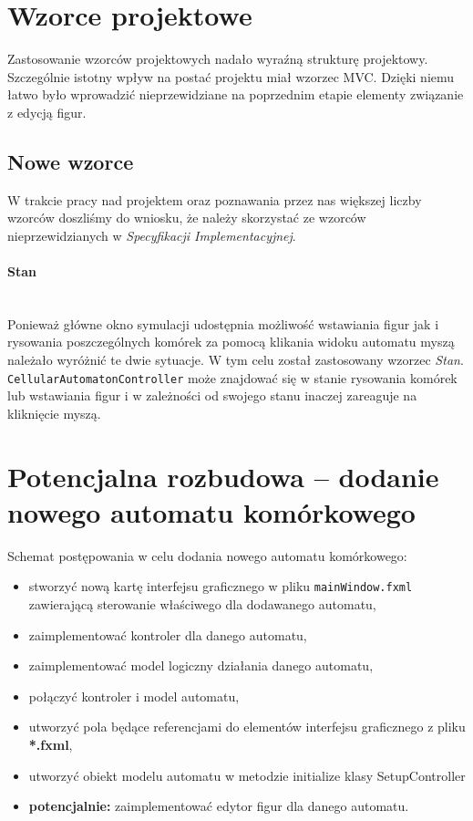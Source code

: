 \documentclass{mwart}
\begin{document}
\section{Wzorce projektowe}
Zastosowanie wzorców projektowych nadało wyraźną strukturę projektowy. Szczególnie istotny wpływ na postać projektu miał wzorzec MVC. Dzięki niemu łatwo było wprowadzić nieprzewidziane na poprzednim etapie elementy związanie z edycją figur.

\subsection{Nowe wzorce}
W trakcie pracy nad projektem oraz poznawania przez nas większej liczby wzorców doszliśmy do wniosku, że należy skorzystać ze wzorców nieprzewidzianych w \textit{Specyfikacji Implementacyjnej}.

\paragraph{Stan} \mbox{} \\
Ponieważ główne okno symulacji udostępnia możliwość wstawiania figur jak i rysowania poszczególnych komórek za pomocą klikania widoku automatu myszą należało wyróżnić te dwie sytuacje. 
W tym celu został zastosowany wzorzec \textit{Stan}. \texttt{CellularAutomatonController} może znajdować się w stanie rysowania komórek lub wstawiania figur i w zależności od swojego stanu inaczej zareaguje na kliknięcie myszą.

\section{Potencjalna rozbudowa -- dodanie nowego automatu komórkowego}
Schemat postępowania w celu dodania nowego automatu komórkowego:
\begin{itemize}
	\item stworzyć nową kartę interfejsu graficznego w pliku \texttt{mainWindow.fxml} zawierającą sterowanie właściwego dla dodawanego automatu,
	\item zaimplementować kontroler dla danego automatu,
	\item zaimplementować model logiczny działania danego automatu,
	\item połączyć kontroler i model automatu,
	\item utworzyć pola będące referencjami do elementów interfejsu graficznego z pliku \textbf{*.fxml}, 
	\item utworzyć obiekt modelu automatu w metodzie initialize klasy SetupController
	\item \textbf{potencjalnie: } zaimplementować edytor figur dla danego automatu.
\end{itemize}
\end{document}
